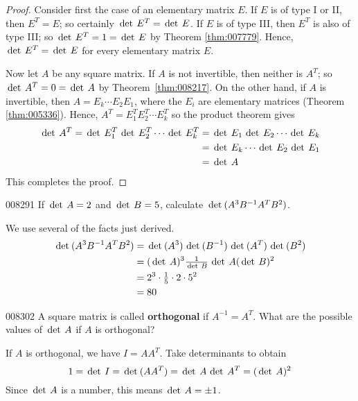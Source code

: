 \begin{proof}
Consider first the case of an elementary matrix $E$. If $E$ is of type I or II, then $E^T = E$; so certainly $\func{det } E^T = \func{det } E$. If $E$ is of type III, then $E^T$ is also of type III; so $\func{det } E^T = 1 = \func{det } E$ by Theorem \ref{thm:007779}. Hence, $\func{det } E^T = \func{det } E$ for every elementary matrix $E$.

Now let $A$ be any square matrix. If $A$ is not invertible, then neither is $A^T$; so $\func{det } A^T = 0 = \func{det } A$ by Theorem~\ref{thm:008217}. On the other hand, if $A$ is invertible, then $A = E_k \cdots E_2E_1$, where the $E_i$ are elementary matrices (Theorem \ref{thm:005336}). Hence, $A^T = E^T_1E^T_2 \cdots E^T_k$ so the product theorem gives
\newpage
\begin{align*}
\func{det } A^T = \func{det } E^T_1 \func{det } E^T_2 \cdots \func{det } E^T_k & = \func{det } E_1 \func{det } E_2 \cdots \func{det } E_k \\
&= \func{det } E_k \cdots \func{det } E_2 \func{det } E_1 \\
&= \func{det } A
\end{align*}
This completes the proof.
\end{proof}

\begin{example}{}{008291 }
If $\func{det } A = 2$ and $\func{det } B = 5$, calculate $\func{det}(A^3 B^{-1}A^TB^2)$.
\begin{solution}
 We use several of the facts just derived.
\begin{align*}
\func{det}(A^3 B^{-1}A^TB^2) &= \func{det} (A^3) \func{det}(B^{-1}) \func{det}(A^T) \func{det} (B^2)\\
&= (\func{det } A)^3 \frac{1}{\func{det } B} \func{det } A (\func{det } B)^2 \\
&= 2^3 \cdot \frac{1}{5} \cdot 2 \cdot 5^2 \\
&= 80
\end{align*}
\end{solution}
\end{example}

\begin{example}{}{008302}
A square matrix is called \textbf{orthogonal} if $A^{-1} = A^T$. What are the possible values of $\func{det } A$ if $A$ is orthogonal?


\begin{solution}
  If $A$ is orthogonal, we have $I = AA^T$. Take determinants to obtain 
\begin{equation*}
1 = \func{det } I = \func{det}(AA^T) = \func{det } A \func{det } A^T = (\func{det } A)^2
\end{equation*}
Since $\func{det } A$ is a number, this means $\func{det } A = \pm 1$.
\end{solution}
\end{example}

